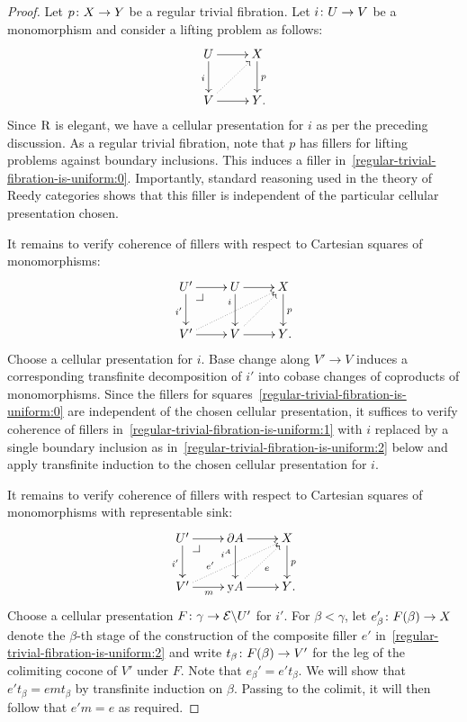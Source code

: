\documentclass[reqno,10pt,a4paper,oneside,draft]{amsart}
\begin{document}
\begin{proof} Let $p \colon X \to Y$ be a regular trivial fibration.
Let $i \colon U \to V$ be a monomorphism and consider a lifting problem as follows:
\begin{equation} \label{regular-trivial-fibration-is-uniform:0}
\xycenter{
  U
  \ar[d]_{i}
  \ar[r]
&
  X
  \ar[d]^{p}
\\
  V
  \ar[r]
  \ar@{.>}[ur]
&
  Y
\rlap{.}
}
\end{equation}
Since $\mathrm{R}$ is elegant, we have a cellular presentation for $i$ as per the preceding discussion.
As a regular trivial fibration, note that $p$ has fillers for lifting problems against boundary inclusions.
This induces a filler in~\eqref{regular-trivial-fibration-is-uniform:0}.
Importantly, standard reasoning used in the theory of Reedy categories shows that this filler is independent of the particular cellular presentation chosen.

It remains to verify coherence of fillers with respect to Cartesian squares of monomorphisms:
\begin{equation} \label{regular-trivial-fibration-is-uniform:1}
\xycenter{
  U'
  \ar[d]_{i'}
  \ar[r]
  \pullback{dr}
&
  U
  \ar[d]_(0.3){i}
  \ar[r]
&
  X
  \ar[d]^{p}
\\
  V'
  \ar[r]
  \ar@{.>}[urr]
&
  V
  \ar[r]
  \ar@{.>}[ur]
&
  Y
\rlap{.}}
\end{equation}
Choose a cellular presentation for $i$.
Base change along $V' \to V$ induces a corresponding transfinite decomposition of $i'$ into cobase changes of coproducts of monomorphisms.
Since the fillers for squares~\eqref{regular-trivial-fibration-is-uniform:0} are independent of the chosen cellular presentation, it suffices to verify coherence of fillers in~\eqref{regular-trivial-fibration-is-uniform:1} with $i$ replaced by a single boundary inclusion as in~\eqref{regular-trivial-fibration-is-uniform:2} below and apply transfinite induction to the chosen cellular presentation for $i$.

It remains to verify coherence of fillers with respect to Cartesian squares of monomorphisms with representable sink:
\begin{equation} \label{regular-trivial-fibration-is-uniform:2}
\xycenter{
  U'
  \ar[d]_{i'}
  \ar[r]
  \pullback{dr}
&
  \partial A
  \ar[d]_(0.3){i^A}
  \ar[r]
&
  X
  \ar[d]^{p}
\\
  V'
  \ar[r]_{m}
  \ar@{.>}[urr]^(0.3){e'}
&
  \yon A
  \ar[r]
  \ar@{.>}[ur]_{e}
&
  Y
\rlap{.}}
\end{equation}
Choose a cellular presentation $F \colon \gamma \to \mathcal{E} \backslash U'$ for $i'$.
For $\beta < \gamma$, let $e_{\beta}' \colon F(\beta) \to X$ denote the $\beta$-th stage of the construction of the composite filler $e'$ in~\eqref{regular-trivial-fibration-is-uniform:2} and write $t_{\beta} \colon F(\beta) \to V'$ for the leg of the colimiting cocone of $V'$ under $F$.
Note that $e_{\beta}' = e' t_{\beta}$.
We will show that $e' t_{\beta} = e m t_{\beta}$ by transfinite induction on $\beta$.
Passing to the colimit, it will then follow that $e' m = e$ as required.


\end{proof}
\end{document}
